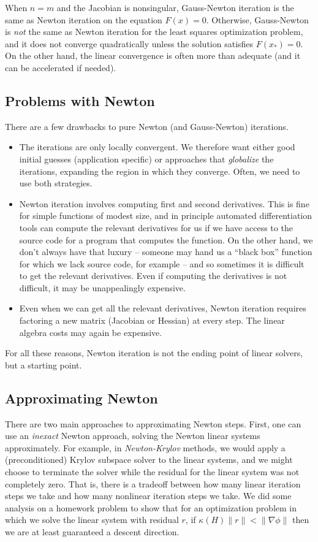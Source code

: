 \documentclass[12pt, leqno]{article}
\begin{document}
When $n = m$ and the Jacobian is nonsingular, Gauss-Newton iteration
is the same as Newton iteration on the equation $F(x) = 0$.
Otherwise, Gauss-Newton is {\em not} the same as Newton iteration for
the least squares optimization problem, and it does not converge
quadratically unless the solution satisfies $F(x_*) = 0$.  On the
other hand, the linear convergence is often more than adequate (and it
can be accelerated if needed).

\subsection{Problems with Newton}

There are a few drawbacks to pure Newton (and Gauss-Newton)
iterations.
\begin{itemize}
\item The iterations are only locally convergent.  We therefore want
  either good initial guesses (application specific) or approaches
  that {\em globalize} the iterations, expanding the region in which
  they converge.  Often, we need to use both strategies.
\item Newton iteration involves computing first and second
  derivatives.  This is fine for simple functions of modest size,
  and in principle automated differentiation tools can compute the
  relevant derivatives for us if we have access to the source code
  for a program that computes the function.  On the other hand,
  we don't always have that luxury -- someone may hand us a ``black
  box'' function for which we lack source code, for example --
  and so sometimes it is difficult to get the relevant derivatives.
  Even if computing the derivatives is not difficult, it may be
  unappealingly expensive.
\item Even when we can get all the relevant derivatives,
  Newton iteration requires factoring a new matrix (Jacobian or
  Hessian) at every step.  The linear algebra costs may again
  be expensive.
\end{itemize}
For all these reasons, Newton iteration is not the ending point
of linear solvers, but a starting point.

\subsection{Approximating Newton}

There are two main approaches to approximating Newton steps.
First, one can use an {\em inexact} Newton approach,
solving the Newton linear systems approximately.  For example,
in {\em Newton-Krylov} methods, we would apply a (preconditioned)
Krylov subspace solver to the linear systems, and we might choose
to terminate the solver while the residual for the linear system
was not completely zero.  That is, there is a tradeoff between how
many linear iteration steps we take and how many nonlinear iteration
steps we take.  We did some analysis on a homework problem
to show that for an optimization problem in which we solve the linear
system with residual $r$, if $\kappa(H) \|r\| < \|\nabla \phi\|$
then we are at least guaranteed a descent direction.
\end{document}
